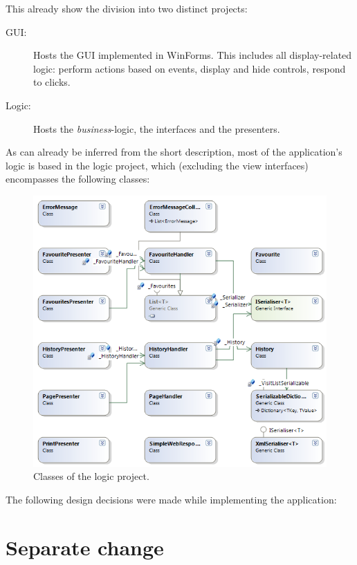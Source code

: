 This already show the division into two distinct projects:

\begin{description}
\item[GUI:] Hosts the \ac{GUI} implemented in WinForms. This includes all display-related logic: perform actions based on events, display and hide controls, respond to clicks.
\item[Logic:] Hosts the \textit{business}-logic, the interfaces and the presenters.
\end{description}

As can already be inferred from the short description, most of the application's logic is based in the logic project, which (excluding the view interfaces) encompasses the following classes:

\begin{figure}[H]
\begin{center}
\includegraphics[width=\textwidth]{gfx/class_diagram.png}
\caption{Classes of the logic project.}
\label{fig:mvp}
\end{center}
\end{figure}

The following design decisions were made while implementing the application:

\section{Separate change}
\label{subsec:separate_change}

